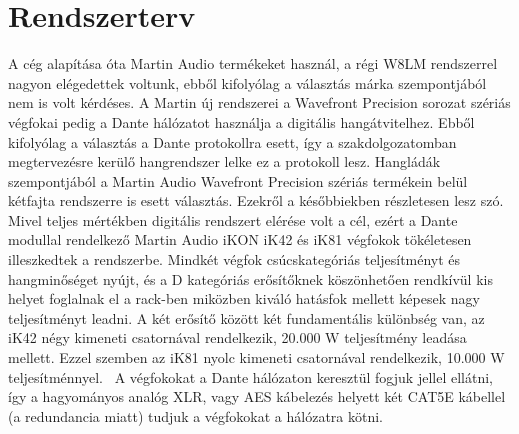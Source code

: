 \section{Rendszerterv}
A cég alapítása óta Martin Audio termékeket használ, a régi W8LM rendszerrel nagyon elégedettek voltunk, 
ebből kifolyólag a választás márka szempontjából nem is volt kérdéses. A Martin új rendszerei a Wavefront Precision sorozat szériás
végfokai pedig a Dante hálózatot használja a digitális hangátvitelhez.
Ebből kifolyólag a választás a Dante protokollra esett, így a szakdolgozatomban 
megtervezésre kerülő hangrendszer lelke ez a protokoll lesz.
Hangládák szempontjából a Martin Audio Wavefront Precision szériás termékein belül kétfajta rendszerre is esett választás.
Ezekről a későbbiekben részletesen lesz szó.
Mivel teljes mértékben digitális rendszert elérése volt a cél, ezért a Dante modullal
rendelkező Martin Audio iKON iK42 és iK81 végfokok tökéletesen illeszkedtek a rendszerbe.
Mindkét végfok csúcskategóriás teljesítményt és hangminőséget nyújt, és a D kategóriás
erősítőknek köszönhetően rendkívül kis helyet foglalnak el a rack-ben miközben kiváló hatásfok
mellett képesek nagy teljesítményt leadni. A két erősítő között két fundamentális különbség van,
az iK42 négy kimeneti csatornával rendelkezik, 20.000 W teljesítmény leadása mellett. 
Ezzel szemben az iK81 nyolc kimeneti csatornával rendelkezik, 10.000 W teljesítménnyel.~\cite{IKONAMPUSEGUIDE}
A végfokokat a Dante hálózaton keresztül fogjuk jellel ellátni, így a hagyományos analóg XLR, vagy AES kábelezés helyett
két CAT5E kábellel (a redundancia miatt) tudjuk a végfokokat a hálózatra kötni. 
